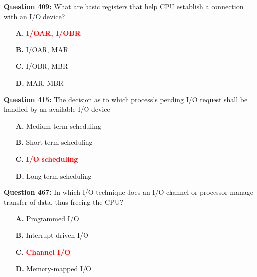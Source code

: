 \documentclass[12pt,a4paper]{article}
\begin{document}
\vspace{0.5cm}

\vspace{0.5cm}

\textbf{Question 409:} What are basic registers that help CPU establish a connection with an I/O device?

\begin{itemize}
    \item[\textbf{A.}] \textcolor{red}{\textbf{I/OAR, I/OBR}}
    \item[\textbf{B.}] I/OAR, MAR
    \item[\textbf{C.}] I/OBR, MBR
    \item[\textbf{D.}] MAR, MBR
\end{itemize}

\vspace{0.5cm}

\vspace{0.5cm}

\textbf{Question 415:} The decision as to which process's pending I/O request shall be handled by an available I/O device

\begin{itemize}
    \item[\textbf{A.}] Medium-term scheduling
    \item[\textbf{B.}] Short-term scheduling
    \item[\textbf{C.}] \textcolor{red}{\textbf{I/O scheduling}}
    \item[\textbf{D.}] Long-term scheduling
\end{itemize}

\vspace{0.5cm}

\vspace{0.5cm}

\textbf{Question 467:} In which I/O technique does an I/O channel or processor manage transfer of data, thus freeing the CPU?

\begin{itemize}
    \item[\textbf{A.}] Programmed I/O
    \item[\textbf{B.}] Interrupt-driven I/O
    \item[\textbf{C.}] \textcolor{red}{\textbf{Channel I/O}}
    \item[\textbf{D.}] Memory-mapped I/O
\end{itemize}

\vspace{0.5cm}
\end{document}

